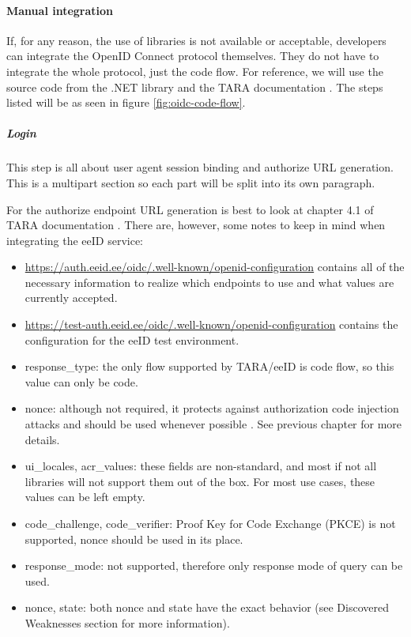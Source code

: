 \paragraph{Manual integration} If, for any reason, the use of libraries is not available or acceptable, developers can integrate the OpenID Connect protocol themselves. They do not have to integrate the whole protocol, just the code flow. For reference, we will use the source code from the {.NET} library \cite{ms-auth-oidc-src} and the TARA documentation \cite{tara-technical}. The steps listed will be as seen in figure \ref{fig:oidc-code-flow}.

\subparagraph{Login}

This step is all about user agent session binding and {authorize URL} generation. This is a multipart section so each part will be split into its own paragraph.

For the {authorize} endpoint URL generation is best to look at chapter 4.1 of TARA documentation \cite{tara-technical}. There are, however, some notes to keep in mind when integrating the eeID service:

\begin{itemize}
  \item \url{https://auth.eeid.ee/oidc/.well-known/openid-configuration} contains all of the necessary information to realize which endpoints to use and what values are currently accepted.
  \item \url{https://test-auth.eeid.ee/oidc/.well-known/openid-configuration} contains the configuration for the eeID test environment.
  \item {response\_type}: the only flow supported by TARA/eeID is code flow, so this value can only be code.
  \item {nonce}: although not required, it protects against authorization code injection attacks and should be used whenever possible \cite{ietf-oauth-security-topics-19}. See previous chapter for more details.
  \item {ui\_locales, acr\_values}: these fields are non-standard, and most if not all libraries will not support them out of the box. For most use cases, these values can be left empty.
  \item {code\_challenge, code\_verifier}: Proof Key for Code Exchange (PKCE) is not supported, {nonce} should be used in its place.
  \item {response\_mode}: not supported, therefore only response mode of {query} can be used.
  \item {nonce, state}: both nonce and state have the exact behavior (see Discovered Weaknesses section for more information).
\end{itemize}

